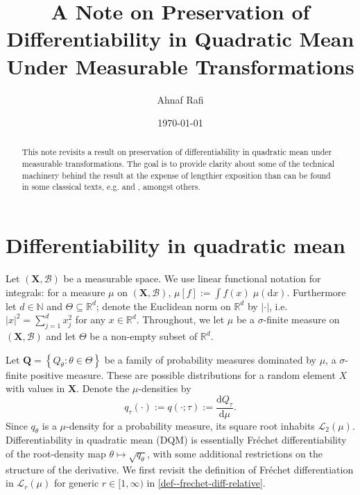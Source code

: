 \documentclass[12pt]{article}
\title{A Note on Preservation of Differentiability in Quadratic Mean Under
Measurable Transformations}
\author{Ahnaf Rafi}
\date{\today}
\let\Cref\autoref
\def\R{\mathbb{R}}
\def\L{\mathscr{L}}
\theoremstyle{definition}
\theoremstyle{plain}
\begin{document}
\maketitle

\begin{abstract}
This note revisits a result on preservation of differentiability in quadratic
mean under measurable transformations.
The goal is to provide clarity about some of the technical machinery behind the
result at the expense of lengthier exposition than can be found in some
classical texts, e.g.
\citet[Theorem 7.2, p. 70]{1981ibragimovStatisticalEstimation} and
\citet[Proposition A.5.5, p. 461]{1998bickelEfficientAdaptiveEstimation},
amongst others.
\end{abstract}

\section{Differentiability in quadratic mean}
\label{sec--dqm-def}

Let \((\mathbf{X}, \mathcal{B})\) be a measurable space.
We use linear functional notation for integrals: for a measure \(\mu\) on
\((\mathbf{X}, \mathcal{B})\), \(\mu [f] := \int f (x) \; \mu (\mathrm{d} x)\).
Furthermore let \(d \in \mathbb{N}\) and \(\Theta \subseteq \R^{d}\); denote the
Euclidean norm on \(\R^{d}\) by \(|\cdot|\), i.e. \(|x|^{2} = \sum_{j = 1}^{d}
x_{j}^{2}\) for any \(x \in \R^{d}\).
Throughout, we let \(\mu\) be a \(\sigma\)-finite measure on \((\mathbf{X},
\mathcal{B})\) and let \(\Theta\) be a non-empty subset of \(\R^{d}\).

Let \(\mathbf{Q} = \left\{ Q_{\theta} : \theta \in \Theta \right\}\) be a family
of probability measures dominated by \(\mu\), a \(\sigma\)-finite positive
measure.
These are possible distributions for a random element \(X\) with values in
\(\mathbf{X}\).
Denote the \(\mu\)-densities by
\begin{equation}
  q_{\tau} (\cdot) := q (\cdot; \tau) := \frac{\mathrm{d}
  Q_{\tau}}{\mathrm{d} \mu}.
  \label{eqn--q-density-and-sqrt}
\end{equation}
Since \(q_{\theta}\) is a \(\mu\)-density for a probability measure, its square
root inhabits \(\L_{2} (\mu)\).
Differentiability in quadratic mean (DQM) is essentially Fr\'echet
differentiability of the root-density map \(\theta \mapsto \sqrt{q_{\theta}}\),
with some additional restrictions on the structure of the derivative.
We first revisit the definition of Fr\'echet differentiation in
\(\L_{r} (\mu)\) for generic \(r \in [1, \infty)\) in
\Cref{def--frechet-diff-relative}.
\end{document}
